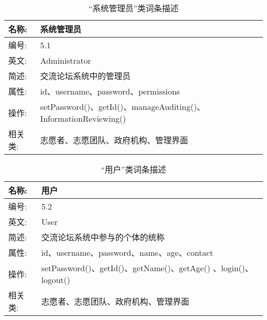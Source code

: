 \begin{table}[H]  
\caption{“系统管理员”类词条描述}  
\begin{center}  
    \begin{tabular}{l p{11cm}} 
        \hline
        \quad 名称:  &  系统管理员 \\
        \hline
        \quad 编号:  & 5.1 \\
        \hline
        \quad 英文:  &  Administrator \\
        \hline
        \quad 简述:  & 交流论坛系统中的管理员 \\
        \hline
        \quad 属性:  & id、username、password、permissions \\
        \hline
        \quad 操作:  & setPassword()、getId()、manageAuditing()、InformationReviewing() \\
        \hline
        \quad 相关类:  & 志愿者、志愿团队、政府机构、管理界面 \\
        \hline
    \end{tabular}
\end{center}
\end{table}

\begin{table}[H]  
\caption{“用户”类词条描述}  
\begin{center}  
    \begin{tabular}{l p{11cm}} 
        \hline
        \quad 名称:  &  用户 \\
        \hline
        \quad 编号:  & 5.2 \\
        \hline
        \quad 英文:  &  User \\
        \hline
        \quad 简述:  & 交流论坛系统中参与的个体的统称 \\
        \hline
        \quad 属性:  & id、username、password、name、age、contact \\
        \hline
        \quad 操作:  & setPassword()、getId()、getName()、getAge() 、login()、logout() \\
        \hline
        \quad 相关类:  & 志愿者、志愿团队、政府机构、管理界面 \\
        \hline
    \end{tabular}
\end{center}
\end{table}

